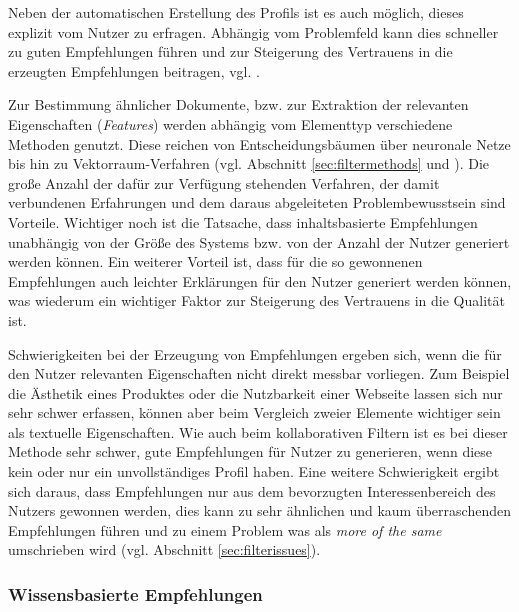 Neben der automatischen Erstellung des Profils ist es auch möglich, dieses explizit vom Nutzer zu erfragen. Abhängig vom Problemfeld kann dies schneller zu guten Empfehlungen führen und zur Steigerung des Vertrauens in die erzeugten Empfehlungen beitragen, vgl. \citep{hb_20}.

Zur Bestimmung ähnlicher Dokumente, bzw. zur Extraktion der relevanten Eigenschaften (\textit{Features}) werden abhängig vom Elementtyp verschiedene Methoden genutzt. Diese reichen von Entscheidungsbäumen über neuronale Netze bis hin zu Vektorraum-Verfahren (vgl. Abschnitt \ref{sec:filtermethods} und \citep[Kap. 3]{rs}). Die große Anzahl der dafür zur Verfügung stehenden Verfahren, der damit verbundenen Erfahrungen und dem daraus abgeleiteten Problembewusstsein sind Vorteile. Wichtiger noch ist die Tatsache, dass inhaltsbasierte Empfehlungen unabhängig von der Größe des Systems bzw. von der Anzahl der Nutzer generiert werden können. Ein weiterer Vorteil ist, dass für die so gewonnenen Empfehlungen auch leichter Erklärungen für den Nutzer generiert werden können, was wiederum ein wichtiger Faktor zur Steigerung des Vertrauens in die Qualität ist.

Schwierigkeiten bei der Erzeugung von Empfehlungen ergeben sich, wenn die für den Nutzer relevanten Eigenschaften nicht direkt messbar vorliegen. Zum Beispiel die Ästhetik eines Produktes oder die Nutzbarkeit einer Webseite lassen sich nur sehr schwer erfassen, können aber beim Vergleich zweier Elemente wichtiger sein als textuelle Eigenschaften. Wie auch beim kollaborativen Filtern ist es bei dieser Methode sehr schwer, gute Empfehlungen für Nutzer zu generieren, wenn diese kein oder nur ein unvollständiges Profil haben. Eine weitere Schwierigkeit ergibt sich daraus, dass Empfehlungen nur aus dem bevorzugten Interessenbereich des Nutzers gewonnen werden, dies kann zu sehr ähnlichen und kaum überraschenden Empfehlungen führen und zu einem Problem was als \textit{more of the same} umschrieben wird (vgl. Abschnitt \ref{sec:filterissues}).  \citep[Kap. 3]{rs} \citep{hb_03}


\subsubsection{Wissensbasierte Empfehlungen}

